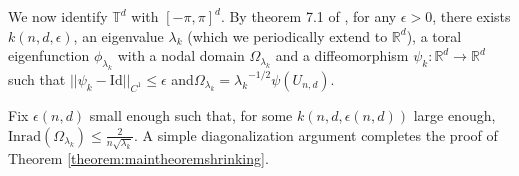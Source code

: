 \documentclass{amsart}
\begin{document}
We now identify $\mathbb T^d$ with $[-\pi, \pi]^d$. By theorem 7.1 of \cite{enc-persal1}, for any $\epsilon >0$, there exists $k(n,d,\epsilon)$, an eigenvalue $\lambda_{k}$ (which we periodically extend to $\mathbb R^d$), a toral eigenfunction $\phi_{\lambda_{k}}$ with a nodal domain $\Omega_{\lambda_{k}}$ and a diffeomorphism $\psi_k: \mathbb R^d \to \mathbb R^d$ such that $||\psi_k- \text{Id}||_{C^1} \leq \epsilon$ and$\Omega_{\lambda_{k}} = {\lambda_{k}}^{-1/2} \psi(U_{n,d})$.

Fix $\epsilon(n,d)$ small enough such that, for some $k(n,d, \epsilon(n,d))$ large enough, $\text{Inrad}(\Omega_{\lambda_{k}}) \leq \frac{2}{n\sqrt{\lambda_{k}}}$. A simple diagonalization argument completes the proof of Theorem \ref{theorem:maintheoremshrinking}.











































    
\end{document}

